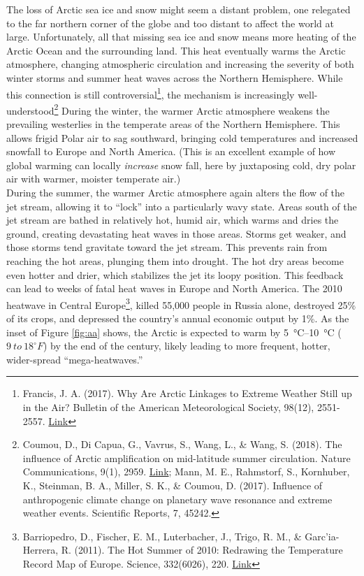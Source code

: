 The loss of Arctic sea ice and snow might seem a distant problem, one relegated to the far northern corner of the globe and too distant to affect the world at large. Unfortunately, all that missing sea ice and snow means more heating of the Arctic Ocean and the surrounding land. This heat eventually warms the Arctic atmosphere, changing atmospheric circulation and increasing the severity of both winter storms and summer heat waves across the Northern Hemisphere. While this connection is still controversial\footnote{Francis, J. A. (2017). Why Are Arctic Linkages to Extreme Weather Still up in the Air? Bulletin of the American Meteorological Society, 98(12), 2551-2557. \href{https://doi.org/10.1175/BAMS-D-17-0006.1}{Link}}, the mechanism is increasingly well-understood\footnote{Coumou, D., Di Capua, G., Vavrus, S., Wang, L., \& Wang, S. (2018). The influence of Arctic amplification on mid-latitude summer circulation. Nature Communications, 9(1), 2959. \href{https://doi.org/10.1038/s41467-018-05256-8}{Link}; Mann, M. E., Rahmstorf, S., Kornhuber, K., Steinman, B. A., Miller, S. K., \& Coumou, D. (2017). Influence of anthropogenic climate change on planetary wave resonance and extreme weather events. Scientific Reports, 7, 45242.} During the winter, the warmer Arctic atmosphere weakens the prevailing westerlies in the temperate areas of the Northern Hemisphere. This allows frigid Polar air to sag southward, bringing cold temperatures and increased snowfall to Europe and North America. (This is an excellent example of how global warming can locally \emph{increase} snow fall, here by juxtaposing cold, dry polar air with warmer, moister temperate air.)\\
During the summer, the warmer Arctic atmosphere again alters the flow of the jet stream, allowing it to ``lock'' into a particularly wavy state. Areas south of the jet stream are bathed in relatively hot, humid air, which warms and dries the ground, creating devastating heat waves in those areas. Storms get weaker, and those storms tend gravitate toward the jet stream. This prevents rain from reaching the hot areas, plunging them into drought. The hot dry areas become even hotter and drier, which stabilizes the jet its loopy position. This feedback can lead to weeks of fatal heat waves in Europe and North America. The 2010 heatwave in Central Europe\footnote{Barriopedro, D., Fischer, E. M., Luterbacher, J., Trigo, R. M., \& Garc'ia-Herrera, R. (2011). The Hot Summer of 2010: Redrawing the Temperature Record Map of Europe. Science, 332(6026), 220. \href{https://doi.org/10.1126/science.1201224}{Link}}, killed 55,000 people in Russia alone, destroyed 25\% of its crops, and depressed the country's annual economic output by 1\%. As the inset of Figure \ref{fig:aa} shows, the Arctic is expected to warm by \SIrange{5}{10}{\celsius} ($9\ to \ 18^{\circ}F$) by the end of the century, likely leading to more frequent, hotter, wider-spread ``mega-heatwaves.''    


